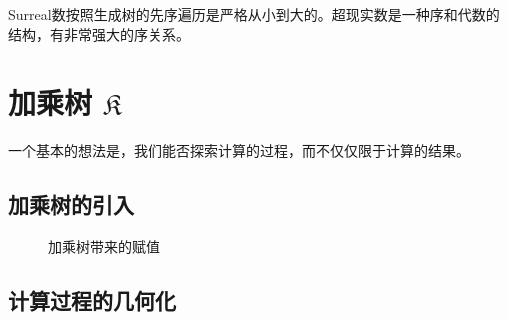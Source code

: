 \documentclass[a4paper,12pt]{article}
\begin{document}
Surreal数按照生成树的先序遍历是严格从小到大的。超现实数是一种序和代数的结构，有非常强大的序关系。

\newpage

\section{加乘树 $\mathfrak{K}$}

一个基本的想法是，我们能否探索计算的过程，而不仅仅限于计算的结果。

\subsection{加乘树的引入}

\begin{figure}[ht]
\centering
{}
\caption{加乘树带来的赋值}
\end{figure}

\subsection{计算过程的几何化}
\end{document}
